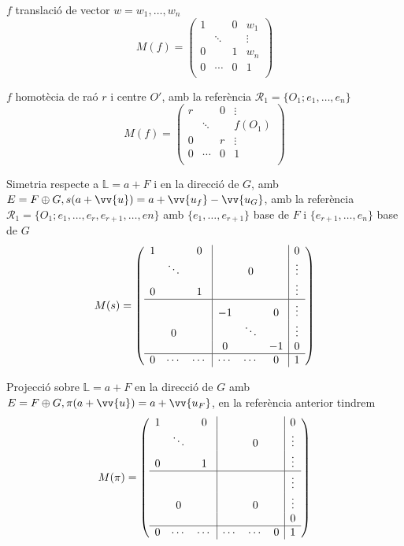 \begin{exmp}
	$f$ translació de vector $w=w_1,\dotsc,w_n$
	\[M(f)=\left(\begin{array}{ccc|c}
		1&&0&w_1\\
		&\ddots&&\vdots\\
		0&&1&w_n\\ \hline
		0&\cdots&0&1\\
	\end{array}\right)\]
\end{exmp}
\begin{exmp}
	$f$ homotècia de raó $r$ i centre $O'$, amb la referència $\mathcal{R}_1=\{O_1;e_1,\dotsc ,e_n\}$
	\[M(f)=\left(\begin{array}{ccc|c}
		r&&0&\vdots\\
		&\ddots&&f(O_1)\\
		0&&r&\vdots\\ \hline
		0&\cdots&0&1\\
	\end{array}\right)\]
\end{exmp}
\begin{exmp}
	Simetria respecte a $\mathbb{L}=a+F$ i en la direcció de $G$, amb $E=F\oplus G, s(a+\vv{u})=a+\vv{u_f}-\vv{u_G}$, amb la referència $\mathcal{R}_1=\{O_1;e_1,\dotsc ,e_r,e_{r+1},\dotsc,en\}$ amb $\{e_1,\dotsc,e_{r+1}\}$ base de $F$ i $\{e_{r+1},\dotsc,e_n\}$ base de $G$
	\[M(s)=\left(\begin{array}{ccc|ccc|c}
		1&&0&&&&0\\
		&\ddots&&&0&&\vdots\\ 
		0&&1&&&&\vdots\\ \hline
		&&&-1&&0&\vdots\\
		&0&&&\ddots&&\vdots\\
		&&&0&&-1&0\\ \hline
		0&\cdots&\cdots&\cdots&\cdots&0&1\\
	\end{array}\right)\]
\end{exmp}
\begin{exmp}
	Projecció sobre $\mathbb{L}=a+F$ en la direcció de $G$ amb $E=F\oplus G,\pi(a+\vv{u})=a+\vv{u_F}$, en la referència anterior tindrem
	\[M(\pi)=\left(\begin{array}{ccc|ccc|c}
		1&&0&&&&0\\
		&\ddots&&&0&&\vdots\\ 
		0&&1&&&&\vdots\\ \hline
		&&&&&&\vdots\\
		&0&&&0&&\vdots\\
		&&&&&&0\\ \hline
		0&\cdots&\cdots&\cdots&\cdots&0&1\\
	\end{array}\right)\]
\end{exmp}

